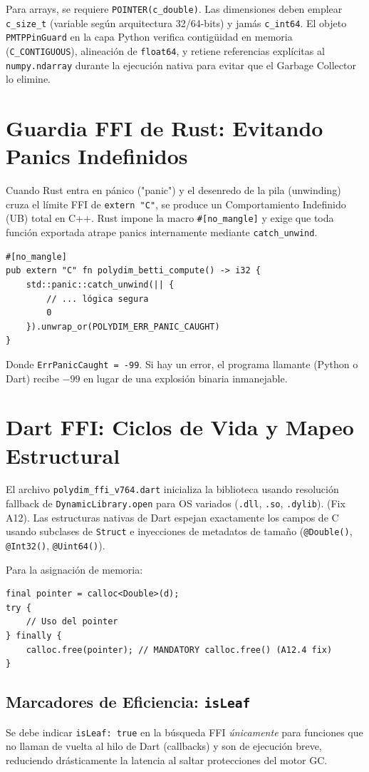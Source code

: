Para arrays, se requiere \texttt{POINTER(c\_double)}. Las dimensiones deben emplear \texttt{c\_size\_t} (variable según arquitectura 32/64-bits) y jamás \texttt{c\_int64}.
El objeto \texttt{PMTPPinGuard} en la capa Python verifica contigüidad en memoria (\texttt{C\_CONTIGUOUS}), alineación de \texttt{float64}, y retiene referencias explícitas al \texttt{numpy.ndarray} durante la ejecución nativa para evitar que el Garbage Collector lo elimine.

\section{Guardia FFI de Rust: Evitando Panics Indefinidos}
Cuando Rust entra en pánico ("panic") y el desenredo de la pila (unwinding) cruza el límite FFI de \texttt{extern "C"}, se produce un Comportamiento Indefinido (UB) total en C++.
Rust impone la macro \texttt{\#[no\_mangle]} y exige que toda función exportada atrape panics internamente mediante \texttt{catch\_unwind}.

\begin{verbatim}
#[no_mangle]
pub extern "C" fn polydim_betti_compute() -> i32 {
    std::panic::catch_unwind(|| {
        // ... lógica segura
        0
    }).unwrap_or(POLYDIM_ERR_PANIC_CAUGHT)
}
\end{verbatim}
Donde \texttt{ErrPanicCaught = -99}. Si hay un error, el programa llamante (Python o Dart) recibe $-99$ en lugar de una explosión binaria inmanejable.

\section{Dart FFI: Ciclos de Vida y Mapeo Estructural}
El archivo \texttt{polydim\_ffi\_v764.dart} inicializa la biblioteca usando resolución fallback de \texttt{DynamicLibrary.open} para OS variados (\texttt{.dll}, \texttt{.so}, \texttt{.dylib}). (Fix A12).
Las estructuras nativas de Dart espejan exactamente los campos de C usando subclases de \texttt{Struct} e inyecciones de metadatos de tamaño (\texttt{@Double()}, \texttt{@Int32()}, \texttt{@Uint64()}).

Para la asignación de memoria:
\begin{verbatim}
final pointer = calloc<Double>(d);
try {
    // Uso del pointer
} finally {
    calloc.free(pointer); // MANDATORY calloc.free() (A12.4 fix)
}
\end{verbatim}

\subsection{Marcadores de Eficiencia: \texttt{isLeaf}}
Se debe indicar \texttt{isLeaf: true} en la búsqueda FFI \emph{únicamente} para funciones que no llaman de vuelta al hilo de Dart (callbacks) y son de ejecución breve, reduciendo drásticamente la latencia al saltar protecciones del motor GC.

